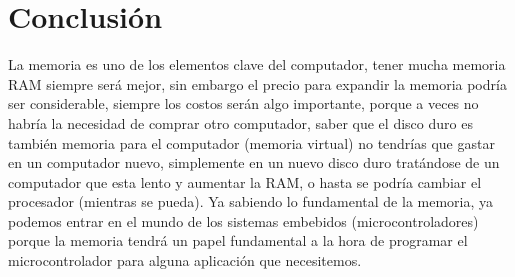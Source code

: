 \documentclass{article}
\begin{document}
\section{Conclusión}\label{conclusion}
La memoria es uno de los elementos clave del computador, tener mucha memoria RAM siempre será mejor, sin embargo el precio para expandir la memoria podría ser considerable, siempre los costos serán algo importante,  porque a veces no habría la necesidad de comprar otro computador, saber que el disco duro es también memoria para el computador (memoria virtual) no tendrías que gastar en un computador nuevo, simplemente en un nuevo disco duro tratándose de un computador que esta lento y aumentar la RAM, o hasta se podría cambiar el procesador (mientras se pueda). Ya sabiendo lo fundamental de la memoria, ya podemos entrar en el mundo de los sistemas embebidos (microcontroladores) porque la memoria tendrá un papel fundamental a la hora de programar el microcontrolador para alguna aplicación que necesitemos.    \\ 



\end{document}
